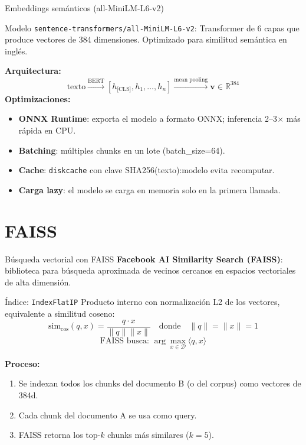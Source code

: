 \documentclass[aspectratio=169]{beamer}
\begin{document}
\begin{frame}{Embeddings semánticos (all-MiniLM-L6-v2)}
  \begin{block}{Modelo}
    \texttt{sentence-transformers/all-MiniLM-L6-v2}: Transformer de 6 capas que produce vectores de 384 dimensiones. Optimizado para similitud semántica en inglés.
  \end{block}
  \vspace{0.3em}
  \textbf{Arquitectura:}
  \[
  \text{texto} \xrightarrow{\text{BERT}} [h_{\text{[CLS]}}, h_1, \dots, h_n] \xrightarrow{\text{mean pooling}} \mathbf{v} \in \mathbb{R}^{384}
  \]
  \vspace{0.3em}
  \textbf{Optimizaciones:}
  \begin{itemize}
    \item \textbf{ONNX Runtime}: exporta el modelo a formato ONNX; inferencia 2--3$\times$ más rápida en CPU.
    \item \textbf{Batching}: múltiples chunks en un lote (batch\_size=64).
    \item \textbf{Cache}: \texttt{diskcache} con clave SHA256(texto):modelo evita recomputar.
    \item \textbf{Carga lazy}: el modelo se carga en memoria solo en la primera llamada.
  \end{itemize}
\end{frame}

\section{FAISS}

\begin{frame}{Búsqueda vectorial con FAISS}
  \textbf{Facebook AI Similarity Search (FAISS)}: biblioteca para búsqueda aproximada de vecinos cercanos en espacios vectoriales de alta dimensión.
  \vspace{0.5em}
  \begin{block}{Índice: \texttt{IndexFlatIP}}
    Producto interno con normalización L2 de los vectores, equivalente a similitud coseno:
    \[
    \text{sim}_{\text{cos}}(q, x) = \frac{q \cdot x}{\|q\| \|x\|} \quad\text{donde}\quad \|q\| = \|x\| = 1
    \]
    \[
    \text{FAISS busca: } \arg\max_{x \in \mathcal{D}} \langle q, x \rangle
    \]
  \end{block}
  \vspace{0.3em}
  \textbf{Proceso:}
  \begin{enumerate}
    \item Se indexan todos los chunks del documento B (o del corpus) como vectores de 384d.
    \item Cada chunk del documento A se usa como query.
    \item FAISS retorna los top-$k$ chunks más similares ($k=5$).
  \end{enumerate}
\end{frame}
\end{document}

